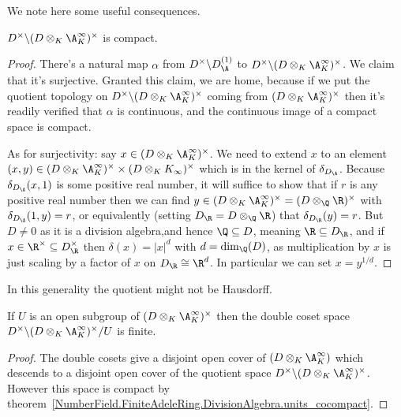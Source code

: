 We note here some useful consequences.

\begin{theorem}
  \label{NumberField.FiniteAdeleRing.DivisionAlgebra.units_cocompact}
  \leanok
  $D^\times\backslash(D\otimes_K\A_K^\infty)^\times$ is compact.
\end{theorem}
\begin{proof}
There's a natural map $\alpha$ from $D^\times\backslash D_{\A}^{(1)}$ to
  $D^\times\backslash (D\otimes_K \A_K^\infty)^\times$. We claim that it's
  surjective. Granted this claim, we are home, because if we put the quotient
  topology on $D^\times\backslash (D\otimes_K \A_K^\infty)^\times$ coming from
  $(D\otimes_K \A_K^\infty)^\times$ then it's readily verified that $\alpha$
  is continuous, and the continuous image of a compact space is compact.

  As for surjectivity: say $x\in (D\otimes_K \A_K^\infty)^\times$. We need to extend
  $x$ to an element $(x,y)\in (D\otimes_K \A_K^\infty)^\times\times(D\otimes_K K_\infty)^\times$
  which is in the kernel of $\delta_{D_{\A}}$. Because $\delta_{D_{\A}}(x,1)$ is some positive
  real number, it will suffice to show that if $r$ is any positive real number then we can
  find $y\in (D\otimes_K \A_K^\infty)^\times=(D\otimes_{\Q}\R)^\times$ with $\delta_{D_{\A}}(1,y)=r$,
  or equivalently (setting $D_{\R}=D\otimes_{\Q}\R$) that $\delta_{D_{\R}}(y)=r$.
  But $D\not=0$ as it is a division algebra,and hence $\Q\subseteq D$, meaning
  $\R\subseteq D_{\R}$, and if
  $x\in\R^\times\subseteq D_{\R}^\times$ then $\delta(x)=|x|^d$ with $d=\dim_{\Q}(D)$,
  as multiplication by $x$ is just scaling by a factor of $x$ on $D_{\R}\cong\R^d$.
  In particular we can set $x=y^{1/d}$.
\end{proof}
\begin{remark} In this generality the quotient might not be Hausdorff.
\end{remark}

\begin{theorem}
  \label{NumberField.FiniteAdeleRing.DivisionAlgebra.finiteDoubleCoset}
  \leanok
  If $U$ is an open subgroup of $(D\otimes_K \A_K^\infty)^\times$
  then the double coset space $D^\times\backslash(D\otimes_K \A_K^\infty)^\times/U$ is finite.
\end{theorem}
\begin{proof}
  \leanok
  The double cosets give a disjoint open cover of $(D\otimes_K \A_K^\infty)$
  which descends to a disjoint open cover of the quotient space
  $D^\times\backslash(D\otimes_K \A_K^\infty)^\times$. However this space is compact
  by theorem~\ref{NumberField.FiniteAdeleRing.DivisionAlgebra.units_cocompact}.
\end{proof}
